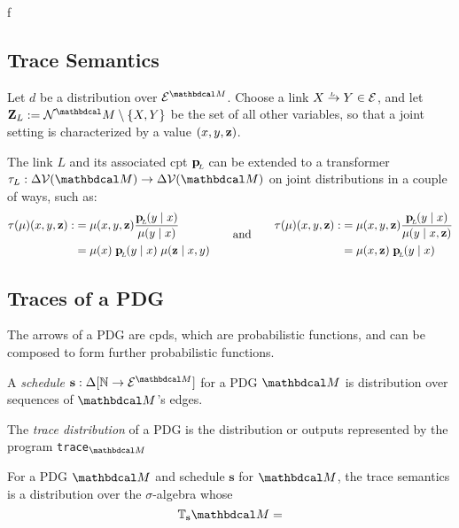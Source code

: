 \documentclass{article}
\begin{document}
	f
\begin{wip}  
	\section{Trace Semantics}
	Let $d$ be a distribution over $\Ed^{\dg M}$. 
	Choose a link $\ed LXY \in \Ed$, and let $\mathbf Z_L := \N^\dg M \setminus \{X, Y\}$ be the set of all other variables, so that a joint setting is characterized by a value $(x,y,\mathbf z)$.
	
	The link $L$ and its associated cpt $\mathbf{p}_{\!_L\!}$ can be extended to a transformer $\tau_L: \Delta \V(\dg M) \to \Delta \V(\dg M)$ on joint distributions in a couple of ways, such as:
\[
	\begin{aligned}
		\tau(\mu)(x,y,\mat z) :&= \mu(x,y,\mat z)\frac{\bp(y \mid x)}{\mu(y\mid x)} \\
		&= \mu(x)\; \bp(y \mid x)\; \mu(\mat z \mid x,y) 
	\end{aligned}\qquad\text{and}\qquad
	\begin{aligned}
		\tau(\mu)(x,y,\mat z) :&= \mu(x,y,\mat z) \frac{\bp(y \mid x)}{\mu(y\mid x, \mathbf z)} \\
		&= \mu(x,\mat z)\; \bp(y \mid x)
	\end{aligned}\\
\]
	
\subsection{Traces of a PDG}
The arrows of a PDG are cpds, which are probabilistic functions, and can be composed to form further probabilistic functions. 

\begin{defn}
	A \emph{schedule} $\mathbf s : \Delta[\mathbb N \to \Ed^{\dg M}]$ for a PDG $\dg M$ is distribution over sequences of $\dg M$'s edges. 
\end{defn}
\begin{defn}
   The \emph{trace distribution} of a PDG is the distribution or outputs represented by the program \texttt{trace}$_{\dg M}$

\end{defn}
\begin{defn}
	For a PDG $\dg M$ and schedule $\mathbf s$ for $\dg M$, the trace semantics is a distribution
	over the $\sigma$-algebra  whose 
	\[ \mathbb{T}_{\bf s}{\dg M} = 
	 \]
\end{defn}
\end{wip}
	
\end{document}
